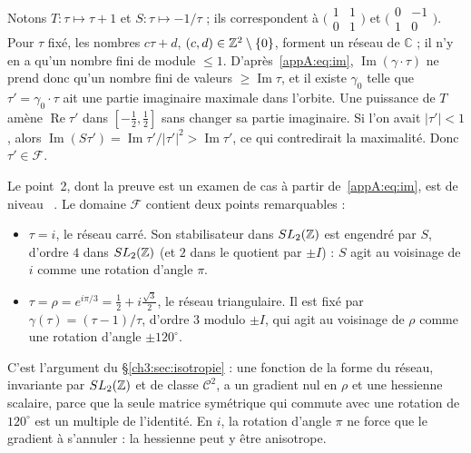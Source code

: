 \begin{humanproof}
Notons $T:\tau\mapsto\tau+1$ et $S:\tau\mapsto-1/\tau$ ; ils correspondent à $\bigl(\begin{smallmatrix}1&1\\0&1\end{smallmatrix}\bigr)$
et $\bigl(\begin{smallmatrix}0&-1\\1&0\end{smallmatrix}\bigr)$. Pour $\tau$ fixé, les nombres $c\tau+d$, $(c,d)\in\mathbb{Z}^2\setminus\{0\}$,
forment un réseau de $\mathbb{C}$ ; il n'y en a qu'un nombre fini de module $\le1$. D'après~\eqref{appA:eq:im},
$\operatorname{Im}(\gamma\cdot\tau)$ ne prend donc qu'un nombre fini de valeurs $\ge\operatorname{Im}\tau$, et il existe
$\gamma_0$ telle que $\tau'=\gamma_0\cdot\tau$ ait une partie imaginaire maximale dans l'orbite. Une puissance de $T$
amène $\operatorname{Re}\tau'$ dans $[-\frac12,\frac12]$ sans changer sa partie imaginaire. Si l'on avait $|\tau'|<1$,
alors $\operatorname{Im}(S\tau')=\operatorname{Im}\tau'/|\tau'|^2>\operatorname{Im}\tau'$, ce qui contredirait la
maximalité. Donc $\tau'\in\mathcal F$.
\end{humanproof}

Le point~2, dont la preuve est un examen de cas à partir de~\eqref{appA:eq:im}, est de niveau \tierL~\cite{app:serre}.
Le domaine $\mathcal F$ contient deux points remarquables :
\begin{itemize}
\item $\tau=i$, le réseau carré. Son stabilisateur dans $SL_2(\mathbb{Z})$ est engendré par $S$, d'ordre $4$ dans $SL_2(\mathbb{Z})$
(et $2$ dans le quotient par $\pm I$) : $S$ agit au voisinage de $i$ comme une rotation d'angle $\pi$.
\item $\tau=\rho=e^{i\pi/3}=\frac12+i\frac{\sqrt3}2$, le réseau triangulaire. Il est fixé par
$\gamma(\tau)=(\tau-1)/\tau$, d'ordre $3$ modulo $\pm I$, qui agit au voisinage de $\rho$ comme une rotation d'angle
$\pm120^\circ$.
\end{itemize}
C'est l'argument du §\ref{ch3:sec:isotropie} : une fonction de la forme du réseau, invariante par $SL_2(\mathbb{Z})$ et de
classe $\mathcal C^2$, a un gradient nul en $\rho$ et une hessienne scalaire, parce que la seule matrice symétrique qui
commute avec une rotation de $120^\circ$ est un multiple de l'identité. En $i$, la rotation d'angle $\pi$ ne force que
le gradient à s'annuler : la hessienne peut y être anisotrope.

